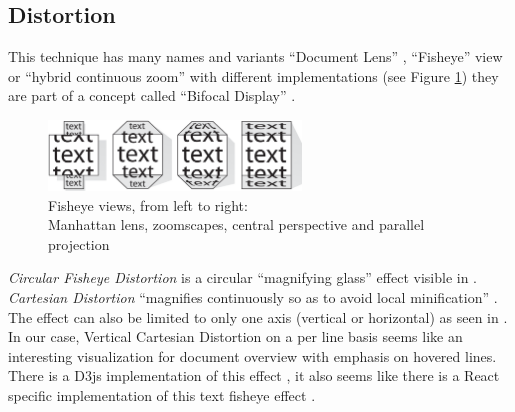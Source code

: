 \documentclass{l4proj}
\begin{document}




\subsection{Distortion}

This technique has many names and variants ``Document Lens'' \autocite{robertsonDocumentLens1993}, ``Fisheye'' view \autocite{greenbergFisheyeTextEditor1996} or ``hybrid continuous zoom'' \autocite{bartramContinuousZoomConstrained1995} with different implementations (see Figure \ref{fig:fisheyes}) they are part of a concept called ``Bifocal Display'' \autocite{apperleyBifocalDisplay}.

\begin{figure}[H]
    \centering
    \includegraphics[width=0.6\textwidth]{images/document_visualization/different-fisheyes.png}
    \caption{Fisheye views, from left to right: \\
        Manhattan lens, zoomscapes, central perspective and parallel projection \\
        \protect\autocite{baudischFishnetFisheyeWeb2004}
    }
    \label{fig:fisheyes}
\end{figure}

\textit{Circular Fisheye Distortion} is a circular ``magnifying glass'' effect visible in \textcite{bostockFisheyeGrid2019}. \textit{Cartesian Distortion} ``magnifies continuously so as to avoid local minification'' \autocite{bostockFisheyeDistortion2012}. The effect can also be limited to only one axis (vertical or horizontal) as seen in \textcite{pstuffaCartesianFisheyeDistortion2019}. In our case, Vertical Cartesian Distortion on a per line basis seems like an interesting visualization for document overview with emphasis on hovered lines. There is a D3js implementation of this effect \autocite{pstuffaCartesianFisheyeDistortion2019}, it also seems like there is a React specific implementation of this text fisheye effect \autocite{zhongVincentdchanReactfisheye2019}.
\end{document}
